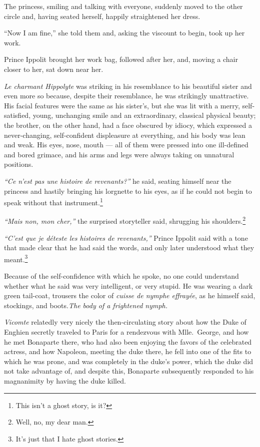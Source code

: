 The princess, smiling and talking with everyone, suddenly moved to the
other circle and, having seated herself, happily straightened her
dress.

``Now I am fine,'' she told them and, asking the viscount to begin,
took up her work.

Prince Ippolit brought her work bag, followed after her, and, moving a
chair closer to her, sat down near her.

\textit{Le charmant Hippolyte} was striking in his resemblance to his
beautiful sister and even more so because, despite their resemblance,
he was strikingly unattractive. His facial features were the same as
his sister's, but she was lit with a merry, self-satisfied, young,
unchanging smile and an extraordinary, classical physical beauty; the
brother, on the other hand, had a face obscured by idiocy, which
expressed a never-changing, self-confident displeasure at everything,
and his body was lean and weak. His eyes, nose, mouth --- all of them
were pressed into one ill-defined and bored grimace, and his arms and
legs were always taking on unnatural positions.

\textit{``Ce n'est pas une histoire de revenants?''} he said, seating
himself near the princess and hastily bringing his lorgnette to his
eyes, as if he could not begin to speak without that
instrument.\footnote{This isn't a ghost story, is it?}

\textit{``Mais non, mon cher,''} the surprised storyteller said,
shrugging his shoulders.\footnote{Well, no, my dear man.}

\textit{``C'est que je d\'eteste les histoires de revenants,''} Prince
Ippolit said with a tone that made clear that he had said the
words, and only later understood what they meant.\footnote{It's just
  that I hate ghost stories.}

Because of the self-confidence with which he spoke, no one could
understand whether what he said was very intelligent, or very
stupid. He was wearing a dark green tail-coat, trousers the color of
\textit{cuisse de nymphe effray\'ee}, as he himself said, stockings,
and boots.\textit{The body of a frightened nymph.}

\textit{Vicomte} relatedly very nicely the then-circulating story
about how the Duke of Enghien secretly traveled to Paris for a
rendezvous with Mlle.~George, and how he met Bonaparte there, who had
also been enjoying the favors of the celebrated actress, and how
Napoleon, meeting the duke there, he fell into one of the fits to
which he was prone, and was completely in the duke's power, which the
duke did not take advantage of, and despite this, Bonaparte
subsequently responded to his magnanimity by having the duke killed.


